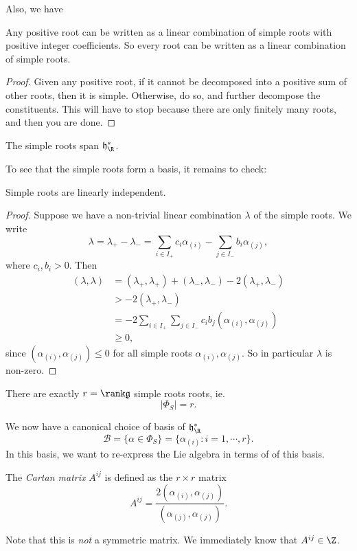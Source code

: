 \documentclass[a4paper]{article}
\begin{document}
Also, we have
\begin{prop}
  Any positive root can be written as a linear combination of simple roots with positive integer coefficients. So every root can be written as a linear combination of simple roots.
\end{prop}

\begin{proof}
  Given any positive root, if it cannot be decomposed into a positive sum of other roots, then it is simple. Otherwise, do so, and further decompose the constituents. This will have to stop because there are only finitely many roots, and then you are done.
\end{proof}

\begin{cor}
  The simple roots span $\mathfrak{h}^*_{\R}$.
\end{cor}

To see that the simple roots form a basis, it remains to check:
\begin{prop}
  Simple roots are linearly independent.
\end{prop}

\begin{proof}
  Suppose we have a non-trivial linear combination $\lambda$ of the simple roots. We write
  \[
    \lambda = \lambda_+ - \lambda_- = \sum_{i \in I_+} c_i \alpha_{(i)} - \sum_{j \in I_-} b_i \alpha_{(j)},
  \]
  where $c_i, b_i > 0$. Then
  \begin{align*}
    (\lambda, \lambda) &= (\lambda_+, \lambda_+) + (\lambda_-, \lambda_-) - 2 (\lambda_+, \lambda_-)\\
    &> -2(\lambda_+, \lambda_-)\\
    &= -2 \sum_{i \in I_+}\sum_{j \in I_-} c_i b_j (\alpha_{(i)}, \alpha_{(j)})\\
    &\geq 0,
  \end{align*}
  since $(\alpha_{(i)}, \alpha_{(j)}) \leq 0$ for all simple roots $\alpha_{(i)}, \alpha_{(j)}$. So in particular $\lambda$ is non-zero.
\end{proof}

\begin{cor}
  There are exactly $r = \rank \mathfrak{g}$ simple roots roots, ie.
  \[
    |\Phi_S| = r.
  \]
\end{cor}
We now have a canonical choice of basis of $\mathfrak{h}_\R^*$
\[
  \mathcal{B} = \{\alpha \in \Phi_S\} = \{\alpha_{(i)}: i = 1, \cdots, r\}.
\]
In this basis, we want to re-express the Lie algebra in terms of of this basis.
\begin{defi}
  The \emph{Cartan matrix} $A^{ij}$ is defined as the $r \times r$ matrix
  \[
    A^{ij} = \frac{2(\alpha_{(i)}, \alpha_{(j)})}{(\alpha_{(j)}, \alpha_{(j)})}.
  \]
\end{defi}
Note that this is \emph{not} a symmetric matrix. We immediately know that $A^{ij} \in \Z$.
\end{document}
